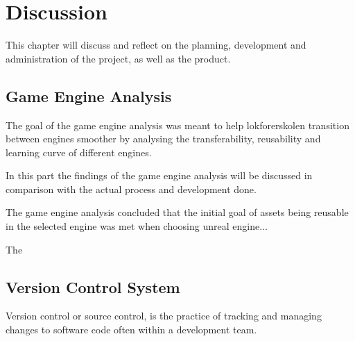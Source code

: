 \chapter{Discussion}

This chapter will discuss and reflect on the planning, development and administration of the project, as well as the product.





\section{Game Engine Analysis}
The goal of the game engine analysis was meant to help \Gls{lokforerskolen} transition between engines smoother by analysing the transferability, reusability and learning curve of different engines. 

In this part the findings of the game engine analysis will be discussed in comparison with the actual process and development done.

The game engine analysis concluded that the initial goal of assets being reusable in the selected engine was met when choosing unreal engine...

The 


\section{Version Control System}
Version control or source control, is the practice of tracking and managing changes to software code often within a development team\cite{what_is_version_control}.


